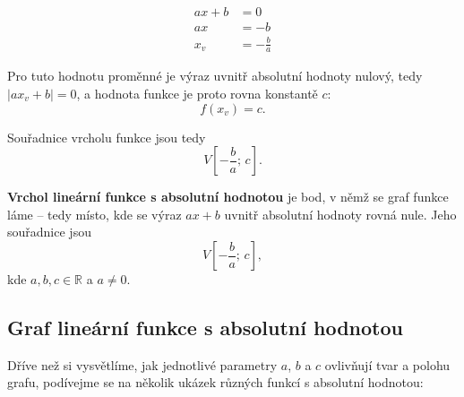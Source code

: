 \documentclass[12pt,a4paper]{article}
\begin{document}
\begin{align*}
a x + b &= 0 \\[4pt]
a x &= -b \\[4pt]
x_v &= -\frac{b}{a}
\end{align*}

Pro tuto hodnotu proměnné je výraz uvnitř absolutní hodnoty nulový, tedy $|a x_v + b| = 0$, a hodnota funkce je proto rovna konstantě $c$:
\[
f(x_v) = c.
\]

Souřadnice vrcholu funkce jsou tedy
\[
V\left[-\frac{b}{a};\, c\right].
\]

\begin{definitionbox}
\textbf{Vrchol lineární funkce s absolutní hodnotou} je bod, v němž se graf funkce láme – tedy místo, kde se výraz $a x + b$ uvnitř absolutní hodnoty rovná nule.  
Jeho souřadnice jsou
\[
V\left[-\frac{b}{a};\, c\right],
\]
kde $a, b, c \in \mathbb{R}$ a $a \ne 0$.
\end{definitionbox}



\subsection{Graf lineární funkce s absolutní hodnotou}

Dříve než si vysvětlíme, jak jednotlivé parametry $a$, $b$ a $c$ ovlivňují tvar a polohu grafu, podívejme se na několik ukázek různých funkcí s absolutní hodnotou:
\end{document}
